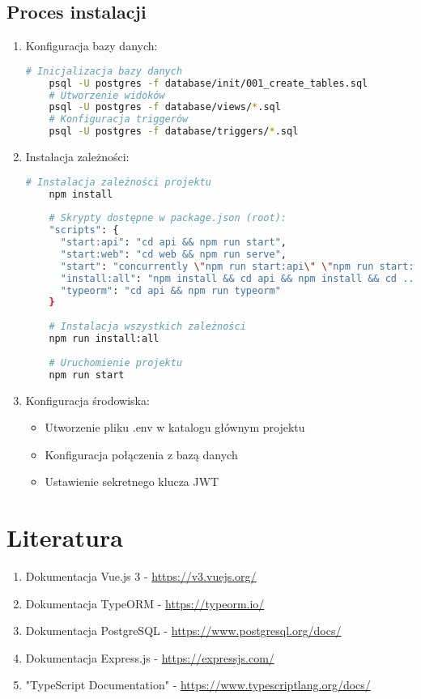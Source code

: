 \documentclass[12pt]{article}
\begin{document}
\subsection{Proces instalacji}
\begin{enumerate}
    \item Konfiguracja bazy danych:
    \begin{lstlisting}[language=bash]
    # Inicjalizacja bazy danych
    psql -U postgres -f database/init/001_create_tables.sql
    # Utworzenie widoków
    psql -U postgres -f database/views/*.sql
    # Konfiguracja triggerów
    psql -U postgres -f database/triggers/*.sql
    \end{lstlisting}
\newpage
    \item Instalacja zależności:
    \begin{lstlisting}[language=bash]
    # Instalacja zależności projektu
    npm install
    
    # Skrypty dostępne w package.json (root):
    "scripts": {
      "start:api": "cd api && npm run start",
      "start:web": "cd web && npm run serve",
      "start": "concurrently \"npm run start:api\" \"npm run start:web\"",
      "install:all": "npm install && cd api && npm install && cd ../web && npm install",
      "typeorm": "cd api && npm run typeorm"
    }
    
    # Instalacja wszystkich zależności
    npm run install:all
    
    # Uruchomienie projektu
    npm run start
    \end{lstlisting}

    \item Konfiguracja środowiska:
    \begin{itemize}
        \item Utworzenie pliku .env w katalogu głównym projektu
        \item Konfiguracja połączenia z bazą danych
        \item Ustawienie sekretnego klucza JWT
    \end{itemize}
\end{enumerate}

\section{Literatura}

\begin{enumerate}
    \item Dokumentacja Vue.js 3 - \url{https://v3.vuejs.org/}
    \item Dokumentacja TypeORM - \url{https://typeorm.io/}
    \item Dokumentacja PostgreSQL - \url{https://www.postgresql.org/docs/}
    \item Dokumentacja Express.js - \url{https://expressjs.com/}
    \item "TypeScript Documentation" - \url{https://www.typescriptlang.org/docs/}
\end{enumerate}
\end{document}
